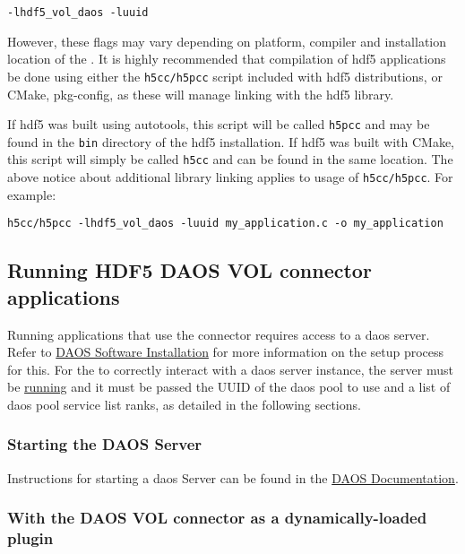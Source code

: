 \documentclass[../users_guide.tex]{subfiles}
\begin{document}
\begin{verbatim}
-lhdf5_vol_daos -luuid
\end{verbatim}

However, these flags may vary depending on platform, compiler and installation
location of the \dvc{}. It is highly recommended that compilation
of \acrshort{hdf5} \dvc{} applications be done using either the
\texttt{h5cc/h5pcc} script included with \acrshort{hdf5} distributions, or CMake,
pkg-config, as these will manage linking with the \acrshort{hdf5} library.

If \acrshort{hdf5} was built using autotools, this script will be called \texttt{h5pcc} and
may be found in the \texttt{bin} directory of the \acrshort{hdf5} installation. If \acrshort{hdf5}
was built with CMake, this script will simply be called \texttt{h5cc} and can
be found in the same location. The above notice about additional library
linking applies to usage of \texttt{h5cc/h5pcc}. For example:
\begin{verbatim}
h5cc/h5pcc -lhdf5_vol_daos -luuid my_application.c -o my_application
\end{verbatim}

\subsection{Running HDF5 DAOS VOL connector applications}
\label{running_daos_vol_apps}

Running applications that use the \dvc{} connector requires access to a \acrshort{daos}
server. Refer to
\href{https://daos-stack.github.io/admin/installation/}{DAOS Software Installation}
for more information on the setup process for this. For the \dvc{}
to correctly interact with a \acrshort{daos} server instance, the server must be \hyperref[sec:daos_serv_start]{running} and it must be passed the UUID of the
\acrshort{daos} pool to use and a list of \acrshort{daos} pool service list ranks, as detailed in the
following sections.

\subsubsection{Starting the DAOS Server}
\label{sec:daos_serv_start}

Instructions for starting a \acrshort{daos} Server can be found in the \href{https://daos-stack.github.io/admin/deployment/#server-startup}{DAOS Documentation}.

\subsubsection{With the DAOS VOL connector as a dynamically-loaded plugin}
\end{document}
